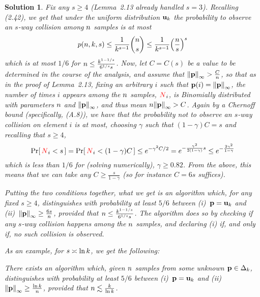 \documentclass[biber,plain]{nowfnt} %
\newtheorem{solution}{Solution}[chapter]
\newcommand{\occur}{\textcolor{red}{N}}
\newcommand{\occur}{N}
\begin{document}
\begin{solution}
Fix any $s\geq 4$ (Lemma~2.13 already handled $s=3$). Recalling (2.42), we get that under the uniform distribution $\mathbf{u}_{ k } $ the probability to observe an $s$-way collision among $n$ samples is at most
\[
	p(\ns,\ab,s) \leq \frac{1}{\ab^{s-1}}\binom{\ns}{s} \leq \frac{1}{\ab^{s-1}}\Paren{\frac{\ns}{s}}^s
\]
which is at most $1/6$ for $n \leq \frac{k^{1-1/s}}{6^{1/s}s}$. Now, let $C=C(s)$ be a value to be determined in the course of the analysis, and assume that $\norminf{\p}> \frac{C}{\ns}$, so that as in the proof of Lemma~2.13, fixing an arbitrary $i$ such that $\p(i) = \norminf{\p}$, the number of times $i$ appears among the $n$ samples, $\occur_i$, is Binomially distributed with parameters $n$ and $\norminf{\p}$, and thus mean $\ns\norminf{\p} > C$. Again by a Chernoff bound (specifically, (A.8)), we have that the probability \emph{not} to observe an $s$-way collision on element $i$ is at most, choosing $\gamma$ such that $(1-\gamma) C=s$ and recalling that $s \geq 4$,
\[
	\probaOf{\occur_i < s } = \probaOf{\occur_i < (1-\gamma) C } \leq e^{-\gamma^2 C/2} = e^{-\frac{\gamma^2}{2(1-\gamma)}s} \leq e^{-\frac{2\gamma^2}{1-\gamma}}
\]
which is less than $1/6$ for (solving numerically), \eg $\gamma \geq 0.82$. From the above, this means that we can take any $C \geq \frac{s}{1-\gamma}$ (so for instance $C = 6s$ suffices).

Putting the two conditions together, what we get is an algorithm which, for any fixed $s\geq 4$, distinguishes  with probability at least $5/6$ between (i)~$\mathbf{p}=\mathbf{u}_{ k } $ and (ii)~$\norminf{\p}\geq \frac{6s}{\ns}$, provided that $n \leq \frac{k^{1-1/s}}{6^{1/s}s}$. The algorithm does so by checking if any $s$-way collision happens among the $n$ samples, and declaring (i) if, and only if, no such collision is observed.\medskip

\noindent As an example, for $s \asymp\ln k$, we get the following:
\begin{corollary}
There exists an algorithm which, given $n$ \iid samples from some unknown $\mathbf{p}\in\Delta_{k}$,  distinguishes  with probability at least $5/6$  between (i)~$\mathbf{p}=\mathbf{u}_{ k } $ and (ii)~$\norminf{\p}\geq \frac{\ln \ab}{\ns}$, provided that $n \lesssim \frac{k}{\ln k}$. 
\end{corollary}
\end{solution}
\end{document}
